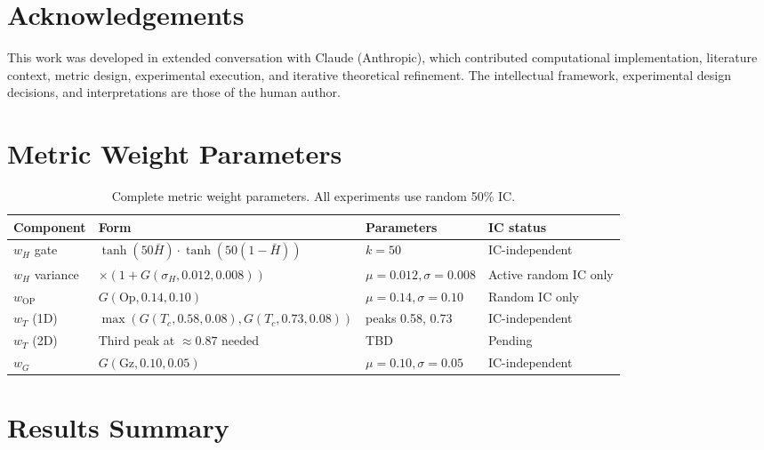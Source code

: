\documentclass[12pt,a4paper]{article}
\begin{document}
\section*{Acknowledgements}

This work was developed in extended conversation with Claude (Anthropic),
which contributed computational implementation, literature context, metric
design, experimental execution, and iterative theoretical refinement.
The intellectual framework, experimental design decisions, and interpretations
are those of the human author.

\appendix
\section{Metric Weight Parameters}

\begin{table}[h]
\centering
\caption{Complete metric weight parameters. All experiments use random 50\% IC.}
\begin{tabular}{llll}
\toprule
Component & Form & Parameters & IC status \\
\midrule
$w_H$ gate     & $\tanh(50\bar{H})\cdot\tanh(50(1{-}\bar{H}))$
               & $k=50$ & IC-independent \\
$w_H$ variance & $\times(1+G(\sigma_H,0.012,0.008))$
               & $\mu{=}0.012, \sigma{=}0.008$ & Active random IC only \\
$w_\text{OP}$  & $G(\text{Op},0.14,0.10)$
               & $\mu{=}0.14, \sigma{=}0.10$ & Random IC only \\
$w_T$ (1D)     & $\max(G(T_c,0.58,0.08),G(T_c,0.73,0.08))$
               & peaks 0.58, 0.73 & IC-independent \\
$w_T$ (2D)     & Third peak at $\approx 0.87$ needed
               & TBD & Pending \\
$w_G$          & $G(\text{Gz},0.10,0.05)$
               & $\mu{=}0.10, \sigma{=}0.05$ & IC-independent \\
\bottomrule
\end{tabular}
\end{table}

\section{Results Summary}
\end{document}
